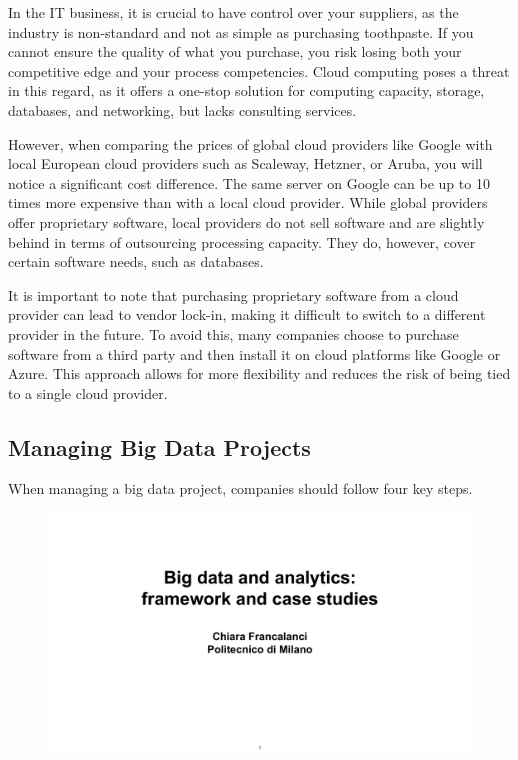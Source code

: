 In the IT business, it is crucial to have control over your suppliers,
as the industry is non-standard and not as simple as purchasing
toothpaste. If you cannot ensure the quality of what you purchase, you
risk losing both your competitive edge and your process competencies.
Cloud computing poses a threat in this regard, as it offers a one-stop
solution for computing capacity, storage, databases, and networking, but
lacks consulting services.

However, when comparing the prices of global cloud providers like Google
with local European cloud providers such as Scaleway, Hetzner, or Aruba,
you will notice a significant cost difference. The same server on Google
can be up to 10 times more expensive than with a local cloud provider.
While global providers offer proprietary software, local providers do
not sell software and are slightly behind in terms of outsourcing
processing capacity. They do, however, cover certain software needs,
such as databases.

It is important to note that purchasing proprietary software from a
cloud provider can lead to vendor lock-in, making it difficult to switch
to a different provider in the future. To avoid this, many companies
choose to purchase software from a third party and then install it on
cloud platforms like Google or Azure. This approach allows for more
flexibility and reduces the risk of being tied to a single cloud
provider.

\subsection{Managing Big Data Projects}

When managing a big data project, companies should follow four key
steps.

\begin{figure}[!h]
  \centering
  \includegraphics[page=84, trim = 1cm 2cm 1.5cm 4cm, clip, width=\imagewidth]{images/06 - BIG_DATA.pdf}
\end{figure}

